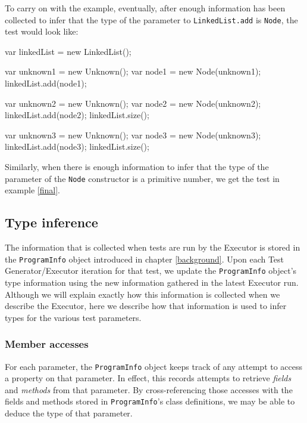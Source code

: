 To carry on with the example, eventually, after enough information has been collected to infer that the type of the parameter to \texttt{LinkedList.add} is \texttt{Node}, the test would look like:

\begin{code}[caption=After type inference for \texttt{LinkedList.add}, label=firstinference]
   var linkedList = new LinkedList();
   
   var unknown1 = new Unknown();
   var node1 = new Node(unknown1);
   linkedList.add(node1);
   
   var unknown2 = new Unknown();
   var node2 = new Node(unknown2);
   linkedList.add(node2);
   linkedList.size();

   var unknown3 = new Unknown();
   var node3 = new Node(unknown3);
   linkedList.add(node3);
   linkedList.size();
\end{code}

Similarly, when there is enough information to infer that the type of the parameter of the \texttt{Node} constructor is a primitive number, we get the test in example \ref{final}.

\subsection{Type inference}
The information that is collected when tests are run by the \textsf{Executor} is stored in the \texttt{ProgramInfo} object introduced in chapter \ref{background}. Upon each \textsf{Test Generator}/\textsf{Executor} iteration for that test, we update the \texttt{ProgramInfo} object's type information using the new information gathered in the latest \textsf{Executor} run. Although we will explain exactly how this information is collected when we describe the \textsf{Executor}, here we describe how that information is used to infer types for the various test parameters.

\subsubsection{Member accesses}
For each parameter, the \texttt{ProgramInfo} object keeps track of any attempt to access a property on that parameter. In effect, this records attempts to retrieve \emph{fields} and \emph{methods} from that parameter. By cross-referencing those accesses with the fields and methods stored in \texttt{ProgramInfo}'s class definitions, we may be able to deduce the type of that parameter. 

